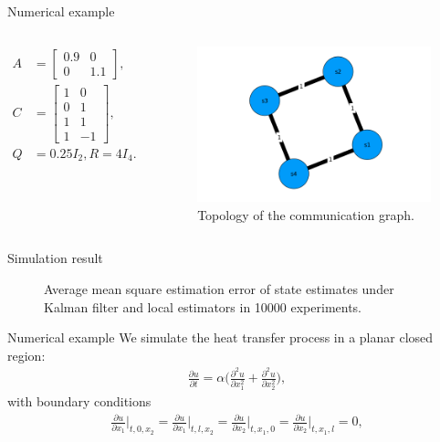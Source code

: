 \documentclass[10pt]{beamer}
\DeclareMathOperator{\1}{\textbf{1}}
\begin{document}
\begin{frame}{Numerical example}
	\begin{columns}[c]
		\column{5cm}
		\begin{align*}
		A&=\begin{bmatrix}
		0.9 & 0\\
		0 & 1.1
		\end{bmatrix},\\
		C&=\begin{bmatrix}
		1 & 0\\
		0 & 1\\
		1 & 1\\
		1 & -1
		\end{bmatrix},\\
		Q&=0.25I_2, R=4I_4.
		\end{align*}
		\column{7cm}
		\begin{figure}
			\centering
			\includegraphics[width=1\textwidth]{pic/topology.png}
			\caption{Topology of the communication graph.}
		\end{figure}
	\end{columns}
\end{frame}

\begin{frame}{Simulation result}
	\begin{figure}
		\centering
		\scalebox{0.7}{}
		\scalebox{0.7}{}
		\caption{Average mean square estimation error of state estimates under Kalman filter and local estimators in 10000 experiments.}
	\end{figure}
\end{frame}

\begin{frame}{Numerical example}
	We simulate the heat transfer process in a planar closed region:
	\begin{align*}
	\frac{\partial u}{\partial t}=\alpha\Big(\frac{\partial^2u}{\partial x_1^2}+\frac{\partial^2u}{\partial x_2^2}\Big),
	\end{align*}
	with boundary conditions
	\begin{align*}
	\frac{\partial u}{\partial x_1}\Big|_{t,0,x_2}=\frac{\partial u}{\partial x_1}\Big|_{t,l,x_2}=\frac{\partial u}{\partial x_2}\Big|_{t,x_1,0}=\frac{\partial u}{\partial x_2}\Big|_{t,x_1,l}=0,
	\end{align*}
\end{frame}
\end{document}
